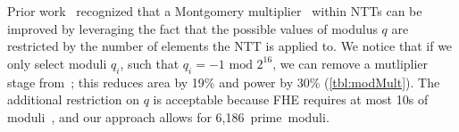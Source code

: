 Prior work~\cite{mert:euromicro19:design}
recognized that a Montgomery multiplier~\cite{montgomery:mom85:modular} within NTTs can be improved by leveraging
the fact that the possible values of modulus $q$ are restricted by the number of elements the NTT is applied to.
We notice that if we only select moduli $q_i$, such that $q_i = -1 \textrm{ mod } 2^{16}$,
we can remove a mutliplier stage from~\cite{mert:euromicro19:design};
this reduces area by 19\% and power by 30\% (\autoref{tbl:modMult}).
The additional restriction on $q$ is acceptable because FHE
requires at most 10s of moduli~\cite{gentry:crypto2012:homomorphic},
and our approach allows for 6,186~prime~moduli.
